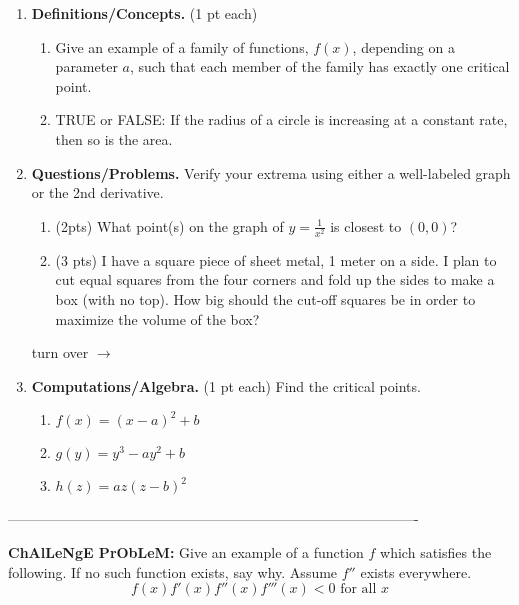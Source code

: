\documentclass[11pt,letterpaper]{article}
\begin{document}
\begin{enumerate}
\item \textbf{Definitions/Concepts.} (1 pt each)
\begin{enumerate}
 \item Give an example of a family of functions, $f(x)$, depending on a parameter $a$, such that each member of the family has exactly one critical point.

\vspace{3pc}
\item TRUE or FALSE: If the radius of a circle is increasing at a constant rate, then so is the area.
\end{enumerate}

\vspace{1pc}
\item \textbf{Questions/Problems.}  Verify your extrema using either a well-labeled graph or the 2nd derivative.
\begin{enumerate}
 \item (2pts) What point(s) on the graph of $y=\frac{1}{x^2}$ is closest to
$(0,0)$?

\vspace{10pc}
\item (3 pts) I have a square piece of sheet metal, 1 meter on a
side. I plan to cut
equal squares from the four corners and fold up the
sides to make a box (with no
top). How big
should the cut-off squares be in order to maximize the
volume of the
box? 
\end{enumerate}

\vspace{10pc}
\begin{flushright}
 turn over $\rightarrow $
\end{flushright}

\pagebreak
\item \textbf{Computations/Algebra.} (1 pt each) Find the critical points.
\begin{enumerate}
\item $f(x)=(x-a)^2+b$

\vspace{5pc}
\item $g(y)=y^3-ay^2+b$

\vspace{5pc}
\item $h(z)=az(z-b)^2$

\vspace{5pc}
\end{enumerate}

\end{enumerate}
----------------------------------------------------------------------------------------

\vspace{1pc}
\noindent \textbf{ChAlLeNgE PrObLeM:}  Give an example of a function $f$ which satisfies the following.  If no such function exists, say why.  Assume $f''$ exists everywhere.  
\[f(x)f'(x)f''(x)f'''(x)<0 \text{ for all }x\]
\end{document}
